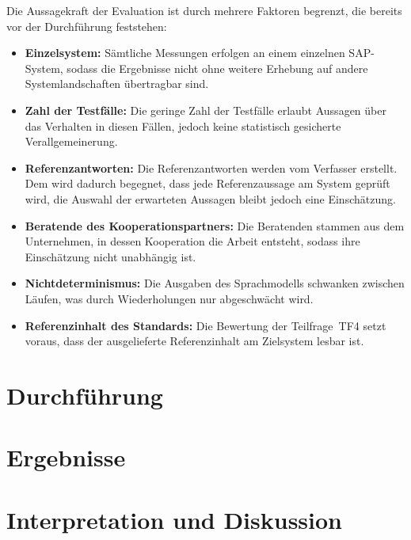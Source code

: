 Die Aussagekraft der Evaluation ist durch mehrere Faktoren begrenzt, die bereits vor der Durchführung feststehen:
\begin{itemize}
	\item \textbf{Einzelsystem:} Sämtliche Messungen erfolgen an einem einzelnen SAP-System, sodass die Ergebnisse nicht ohne weitere Erhebung auf andere Systemlandschaften übertragbar sind.
	\item \textbf{Zahl der Testfälle:} Die geringe Zahl der Testfälle erlaubt Aussagen über das Verhalten in diesen Fällen, jedoch keine statistisch gesicherte Verallgemeinerung.
	\item \textbf{Referenzantworten:} Die Referenzantworten werden vom Verfasser erstellt. Dem wird dadurch begegnet, dass jede Referenzaussage am System geprüft wird, die Auswahl der erwarteten Aussagen bleibt jedoch eine Einschätzung.
	\item \textbf{Beratende des Kooperationspartners:} Die Beratenden stammen aus dem Unternehmen, in dessen Kooperation die Arbeit entsteht, sodass ihre Einschätzung nicht unabhängig ist.
	\item \textbf{Nichtdeterminismus:} Die Ausgaben des Sprachmodells schwanken zwischen Läufen, was durch Wiederholungen nur abgeschwächt wird.
	\item \textbf{Referenzinhalt des Standards:} Die Bewertung der Teilfrage~TF4 setzt voraus, dass der ausgelieferte Referenzinhalt am Zielsystem lesbar ist.
\end{itemize}

\section{Durchführung}
\label{sec:eval-durchfuehrung}

\section{Ergebnisse}
\label{sec:eval-ergebnisse}

\section{Interpretation und Diskussion}
\label{sec:eval-diskussion}

